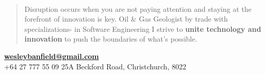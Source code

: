 \documentclass[]{friggeri-cv}
\begin{document}
~
\begin{quote}
\large
Disruption occurs when you are not paying attention and staying at the forefront of innovation is key. Oil \& Gas Geologist by trade with specializations- in Software Engineering I strive to \textbf{unite technology and innovation} to push the boundaries of what’s possible.
\end{quote}

\begin{center}
\vspace{9pt}
\href{mailto:wesleybanfield@gmail.com}{\textbf{wesleybanfield@gmail.com}}
\\+64 27 777 55 09 25A Beckford Road, Christchurch, 8022
\end{center}
\end{document}
